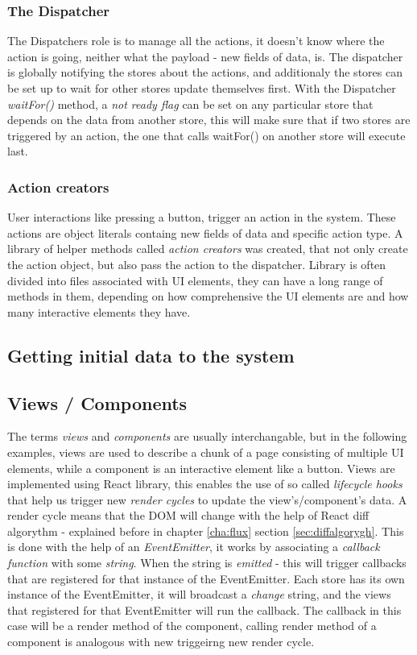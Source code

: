 \subsubsection*{The Dispatcher}
The Dispatchers role is to manage all the actions, it doesn't know where the action is going, neither what the payload - new fields of data, is. The dispatcher is globally notifying the stores about the actions, and additionaly the stores can be set up to wait for other stores update themselves first. With the Dispatcher \emph{waitFor()} method, a \emph{not ready flag} can be set on any particular store that depends on the data from another store, this will make sure that if two stores are triggered by an action, the one that calls waitFor() on another store will execute last. 

\subsubsection*{Action creators}
User interactions like pressing a button, trigger an action in the system. These actions are object literals containg new fields of data and specific action type. A library of helper methods called \emph{action creators} was created, that not only create the action object, but also pass the action to the dispatcher. Library is often divided into files associated with UI elements, they can have a long range of methods in them, depending on how comprehensive the UI elements are and how many interactive elements they have.

\subsection*{Getting initial data to the system}

\subsection*{Views / Components}
The terms \emph{views} and \emph{components} are usually interchangable, but in the following examples, views are used to describe a chunk of a page consisting of multiple UI elements, while a component is an interactive element like a button. Views are implemented using React library, this enables the use of so called \emph{lifecycle hooks} that help us trigger new \emph{render cycles} to update the view's/component's data. A render cycle means that the DOM will change with the help of React diff algorythm - explained before in chapter \ref{cha:flux} section \ref{sec:diffalgorygh}. This is done with the help of an \emph{EventEmitter}, it works by associating a \emph{callback function} with some \emph{string}. When the string is \emph{emitted} - this will trigger callbacks that are registered for that instance of the EventEmitter. Each store has its own instance of the EventEmitter, it will broadcast a \emph{change} string, and the views that registered for that EventEmitter will run the callback. The callback in this case will be a render method of the component, calling render method of a component is analogous with new triggeirng new render cycle.

